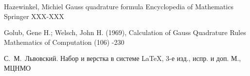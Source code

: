 \begin{thebibliography}{2013}
\label{gauss_book}
 \by Hazewinkel, Michiel
 \paper Gauss quadrature formula
 \jour Encyclopedia of Mathematics
 \publaddr Springer
 \pages XXX-XXX
 
\label{gauss_article}
  \by Golub, Gene H.; Welsch, John H. (1969), 
  \paper Calculation of Gauss Quadrature Rules
  \jour Mathematics of Computation
   (106)
  -230

\by С.~М.~Львовский.
\book Набор и верстка в системе \LaTeX, 3-е изд., испр. и доп.
\publaddr М., МЦНМО

\end{thebibliography}

\endinput

